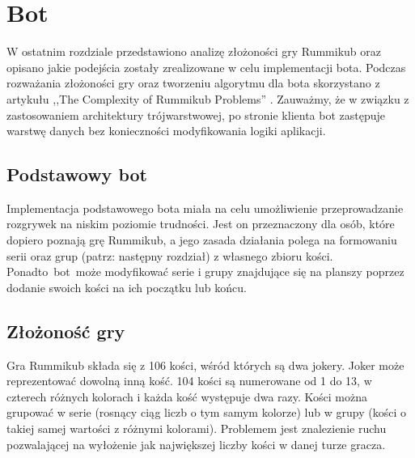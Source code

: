 \chapter{Bot}
\thispagestyle{chapterBeginStyle}

W ostatnim rozdziale przedstawiono analizę złożoności gry Rummikub oraz 
opisano jakie podejścia zostały zrealizowane %
w celu  implementacji bota. Podczas rozważania złożoności gry oraz %
tworzeniu algorytmu dla bota skorzystano z artykułu ,,The Complexity of Rummikub Problems'' \cite{RummikubComplexity}. 
Zauważmy, że w związku z zastosowaniem architektury trójwarstwowej, %
 po stronie klienta bot zastępuje  warstwę danych bez konieczności modyfikowania logiki aplikacji.

\section{Podstawowy bot}

Implementacja podstawowego bota miała na celu umożliwienie przeprowadzanie rozgrywek na niskim poziomie trudności. Jest on przeznaczony dla osób, które dopiero poznają grę Rummikub, a jego zasada działania polega na formowaniu serii oraz grup %
(patrz: następny rozdział) z własnego zbioru kości. \mbox{Ponadto bot może} modyfikować %
serie i grupy
znajdujące się na planszy poprzez dodanie swoich kości na ich początku lub końcu. %

\section{Złożoność gry}

Gra Rummikub składa się z 106 kości, %
wśród których są dwa jokery. 
Joker może reprezentować %
 dowolną inną kość. 
  104 kości są numerowane od 1 do 13, w czterech różnych kolorach i każda kość występuje dwa razy. 
  Kości można grupować w %
  serie (rosnący ciąg liczb o tym samym kolorze) lub w grupy (kości o takiej samej %
  wartości z różnymi kolorami). Problemem jest znalezienie %
  ruchu pozwalającej na wyłożenie jak największej liczby kości w danej turze gracza.


